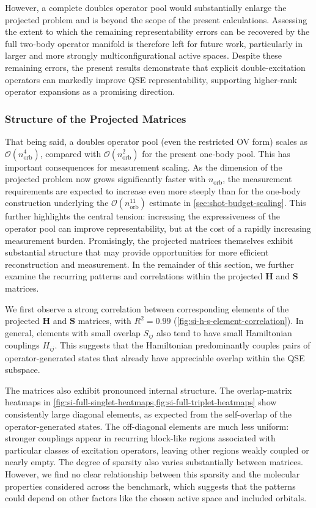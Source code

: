 However, a complete doubles operator pool would substantially enlarge the projected problem and is beyond the scope of the present calculations. 
Assessing the extent to which the remaining representability errors can be recovered by the full two-body operator manifold is therefore left for future work, particularly in larger and more strongly multiconfigurational active spaces. 
Despite these remaining errors, the present results demonstrate that explicit double-excitation operators can markedly improve QSE representability, supporting higher-rank operator expansions as a promising direction.

\subsubsection{Structure of the Projected Matrices}
That being said, a doubles operator pool (even the restricted OV form) scales as $\mathcal{O}\!\left(n_{\mathrm{orb}}^{4}\right)$, compared with $\mathcal{O}\!\left(n_{\mathrm{orb}}^{2}\right)$ for the present one-body pool. 
This has important consequences for measurement scaling. 
As the dimension of the projected problem now grows significantly faster with $n_{\mathrm{orb}}$, the measurement requirements are expected to increase even more steeply than for the one-body construction underlying the $\mathcal{O}\!\left(n_{\mathrm{orb}}^{11}\right)$ estimate in \cref{sec:shot-budget-scaling}. 
This further highlights the central tension: increasing the expressiveness of the operator pool can improve representability, but at the cost of a rapidly increasing measurement burden. 
Promisingly, the projected matrices themselves exhibit substantial structure that may provide opportunities for more efficient reconstruction and measurement. 
In the remainder of this section, we further examine the recurring patterns and correlations within the projected $\mathbf{H}$ and $\mathbf{S}$ matrices.

We first observe a strong correlation between corresponding elements of the projected $\mathbf{H}$ and $\mathbf{S}$ matrices, with $R^2=0.99$ (\cref{fig:si-h-s-element-correlation}). 
In general, elements with small overlap ${S}_{ij}$ also tend to have small Hamiltonian couplings ${H}_{ij}$. 
This suggests that the Hamiltonian predominantly couples pairs of operator-generated states that already have appreciable overlap within the QSE subspace. 

The matrices also exhibit pronounced internal structure. The overlap-matrix heatmaps in \cref{fig:si-full-singlet-heatmaps,fig:si-full-triplet-heatmaps} show consistently large diagonal elements, as expected from the self-overlap of the operator-generated states. 
The off-diagonal elements are much less uniform: stronger couplings appear in recurring block-like regions associated with particular classes of excitation operators, leaving other regions weakly coupled or nearly empty.
The degree of sparsity also varies substantially between matrices. 
However, we find no clear relationship between this sparsity and the molecular properties considered across the benchmark, which suggests that the patterns could depend on other factors like the chosen active space and included orbitals.


